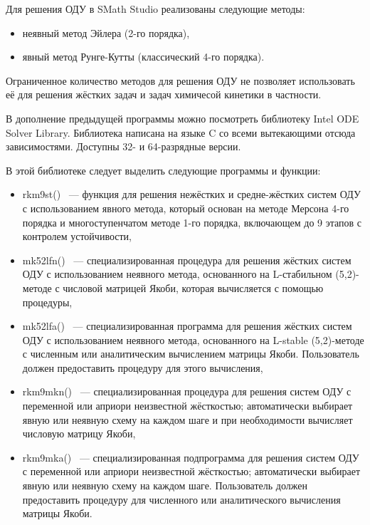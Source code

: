Для решения ОДУ в SMath Studio реализованы следующие методы:

\begin{itemize}
    \item неявный метод Эйлера (2-го порядка),
    \item явный метод Рунге-Кутты (классический 4-го порядка).
\end{itemize}

Ограниченное количество методов для решения ОДУ не позволяет использовать её для решения жёстких задач и задач химичесой кинетики
в частности.

В дополнение предыдущей программы можно посмотреть библиотеку Intel ODE Solver Library.
Библиотека написана на языке C со всеми вытекающими отсюда зависимостями. Доступны 32- и 64-разрядные версии.

В этой библиотеке следует выделить следующие программы и функции:
\begin{itemize}
    \item rkm9st() ~--- функция для решения нежёстких и средне-жёстких систем ОДУ с использованием явного метода, который основан на
        методе Мерсона 4-го порядка и многоступенчатом методе 1-го порядка, включающем до 9 этапов с контролем устойчивости,
    \item mk52lfn() ~--- специализированная процедура для решения жёстких систем ОДУ с использованием неявного метода, основанного
        на L-стабильном (5,2)-методе с числовой матрицей Якоби, которая вычисляется с помощью процедуры,
    \item mk52lfa() ~--- специализированная программа для решения жёстких систем ОДУ с использованием неявного метода, основанного на
        L-stable (5,2)-методе с численным или аналитическим вычислением матрицы Якоби. Пользователь должен предоставить процедуру для
        этого вычисления,
    \item rkm9mkn() ~--- специализированная процедура для решения систем ОДУ с переменной или априори неизвестной жёсткостью;
        автоматически выбирает явную или неявную схему на каждом шаге и при необходимости вычисляет числовую матрицу Якоби,
    \item rkm9mka() ~--- специализированная подпрограмма для решения систем ОДУ с переменной или априори неизвестной жёсткостью;
        автоматически выбирает явную или неявную схему на каждом шаге. Пользователь должен предоставить процедуру для численного или
        аналитического вычисления матрицы Якоби.
\end{itemize}

